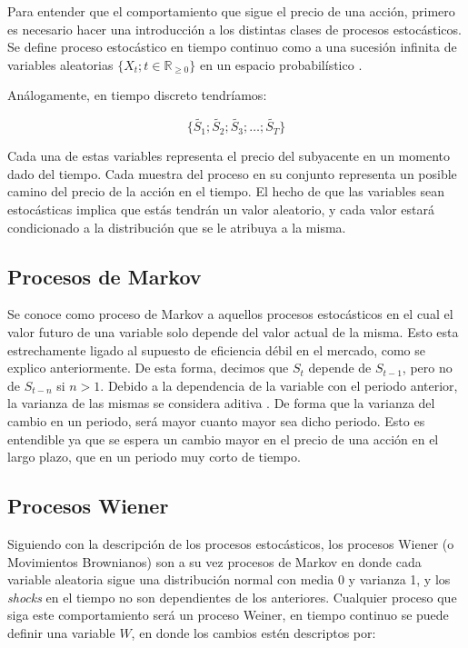 Para entender que el comportamiento que sigue el precio de una acción, primero es necesario hacer una introducción a los distintas clases de procesos estocásticos. Se define proceso estocástico en tiempo continuo como a una sucesión infinita de variables aleatorias $ \{X_t ; t \in \mathbb{R}_{\geq0}\} $ en un espacio probabilístico \cite{rosenthal}.

Análogamente, en tiempo discreto tendríamos:

\[ \{ \tilde{S_1}; \tilde{S_2}; \tilde{S_3}; \ldots; \tilde{S_T} \} \]

Cada una de estas variables representa el precio del subyacente en un momento dado del tiempo. Cada muestra del proceso en su conjunto representa un posible camino del precio de la acción en el tiempo. El hecho de que las variables sean estocásticas implica que estás tendrán un valor aleatorio, y cada valor estará condicionado a la distribución que se le atribuya a la misma.

\subsection{Procesos de Markov}

Se conoce como proceso de Markov a aquellos procesos estocásticos en el cual el valor futuro de una variable solo depende del valor actual de la misma. Esto esta estrechamente ligado al supuesto de eficiencia débil en el mercado, como se explico anteriormente.
De esta forma, decimos que $ S_{t} $ depende de $ S_{t-1} $, pero no de $ S_{t-n} $ si $n>1$. Debido a la dependencia de la variable con el periodo anterior, la varianza de las mismas se considera aditiva \cite{hulleng}. De forma que la varianza del cambio en un periodo, será mayor cuanto mayor sea dicho periodo. Esto es entendible ya que se espera un cambio mayor en el precio de una acción en el largo plazo, que en un periodo muy corto de tiempo.

\subsection{Procesos Wiener}

Siguiendo con la descripción de los procesos estocásticos, los procesos Wiener (o Movimientos Brownianos) son a su vez procesos de Markov en donde cada variable aleatoria sigue una distribución normal con media 0 y varianza 1, y los \textit{shocks} en el tiempo no son dependientes de los anteriores. Cualquier proceso que siga este comportamiento será un proceso Weiner, en tiempo continuo se puede definir una variable $W$, en donde los cambios estén descriptos por:

